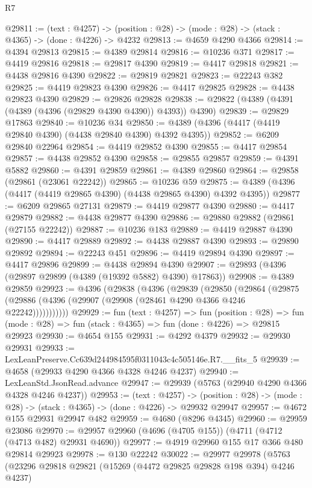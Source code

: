\begin{lexlean}{R7}
\begin{coremodule}
@29811 := (text : @4257) ->
  (position : @28) -> (mode : @28) -> (stack : @4365) -> (done : @4226) -> @4232
@29813 := @4659 @4290 @4366
@29814 := @4394 @29813
@29815 := @4389 @29814
@29816 := @10236 @371
@29817 := @4419 @29816
@29818 := @29817 @4390
@29819 := @4417 @29818
@29821 := @4438 @29816 @4390
@29822 := @29819 @29821
@29823 := @22243 @382
@29825 := @4419 @29823 @4390
@29826 := @4417 @29825
@29828 := @4438 @29823 @4390
@29829 := @29826 @29828
@29838 := @29822 (@4389 (@4391 (@4389 (@4396 (@29829 @4390 @4390)) @4393)) @4390)
@29839 := @29829 @17863
@29840 := @10236 @34
@29850 := @4389 (@4396 (@4417 (@4419 @29840 @4390) (@4438 @29840 @4390) @4392 @4395))
@29852 := @6209 @29840 @22964
@29854 := @4419 @29852 @4390
@29855 := @4417 @29854
@29857 := @4438 @29852 @4390
@29858 := @29855 @29857
@29859 := @4391 @5882
@29860 := @4391 @29859
@29861 := @4389 @29860
@29864 := @29858 (@29861 (@23061 @22242))
@29865 := @10236 @59
@29875 := @4389 (@4396 (@4417 (@4419 @29865 @4390) (@4438 @29865 @4390) @4392 @4395))
@29877 := @6209 @29865 @27131
@29879 := @4419 @29877 @4390
@29880 := @4417 @29879
@29882 := @4438 @29877 @4390
@29886 := @29880 @29882 (@29861 (@27155 @22242))
@29887 := @10236 @183
@29889 := @4419 @29887 @4390
@29890 := @4417 @29889
@29892 := @4438 @29887 @4390
@29893 := @29890 @29892
@29894 := @22243 @451
@29896 := @4419 @29894 @4390
@29897 := @4417 @29896
@29899 := @4438 @29894 @4390
@29907 := @29893 (@4396 (@29897 @29899 (@4389 (@19392 @5882) @4390) @17863))
@29908 := @4389 @29859
@29923 := @4396
    (@29838
      (@4396
        (@29839
          (@29850
            (@29864
              (@29875 (@29886 (@4396 (@29907 (@29908 (@28461 @4290 @4366 @4246 @22242)))))))))))
@29929 := fun (text : @4257) =>
  fun (position : @28) =>
  fun (mode : @28) => fun (stack : @4365) => fun (done : @4226) => @29815 @29923
@29930 := @4654 @155
@29931 := @4292 @4379
@29932 := @29930 @29931
@29933 := LexLeanPreserve.Cc639d244984595f0311043c4c505146e.R7.__fits_5
@29939 := @4658 (@29933 @4290 @4366 @4328 @4246 @4237)
@29940 := LexLeanStd.JsonRead.advance
@29947 := @29939 (@5763 (@29940 @4290 @4366 @4328 @4246 @4237))
@29953 := (text : @4257) ->
  (position : @28) -> (mode : @28) -> (stack : @4365) -> (done : @4226) -> @29932 @29947
@29957 := @4672 @155 @29931 @29947 @482
@29959 := @4680 (@8296 @4345)
@29960 := @29959 @23086
@29970 := @29957 @29960 (@4696 (@4705 @155)) (@4711 (@4712 (@4713 @482) @29931 @4690))
@29977 := @4919 @29960 @155 @17 @366 @480 @29814 @29923
@29978 := @130 @22242
@30022 := @29977
    @29978
    (@5763
      (@23296
        @29818
        @29821
        (@15269 (@4472 @29825 @29828 @198 @394) @4246 @4237)

\end{coremodule}
\end{lexlean}
